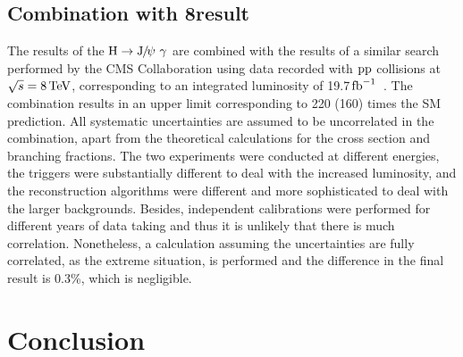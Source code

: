 \subsection*{Combination with 8\TeV result}
The results of the $\PH\rightarrow\JPsi\ \gamma$ are combined with the results of a similar search performed by the CMS Collaboration using data recorded with $\mathrm{p}\mathrm{p}$ collisions at $\sqrt{s}=8\,\text{Te\hspace{-.08em}V}$, corresponding to an integrated luminosity of 19.7$\mbox{\ensuremath{\,\text{fb}^\text{$-$1}}}$~\cite{Run1Paper_Dalitz}. The combination results in an upper limit corresponding to 220 (160) times the SM prediction. All systematic uncertainties are assumed to be uncorrelated in the combination, apart from the theoretical calculations for the cross section and branching fractions. 
The two experiments were conducted at different energies, the triggers were substantially different to deal with the increased luminosity, and the reconstruction algorithms were different and more sophisticated to deal with the larger backgrounds. Besides, independent calibrations were performed for different years of data taking and thus it is unlikely that there is much correlation. 
Nonetheless, a calculation assuming the uncertainties are fully correlated, as the extreme situation, is performed and the difference in the final result is 0.3\%, which is negligible.

\section{Conclusion}

